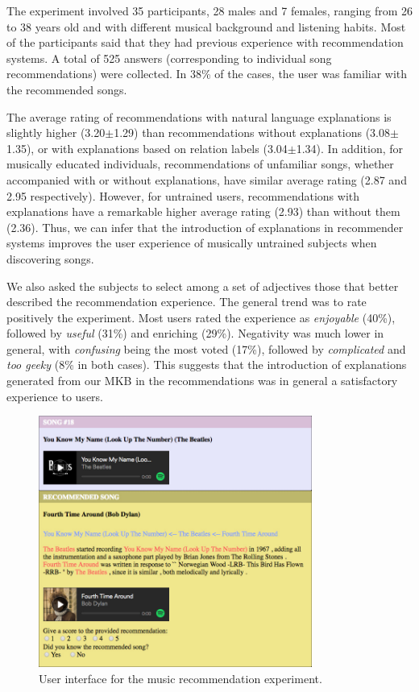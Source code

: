 The experiment involved 35 participants, 28 males and 7 females, ranging from 26 to 38 years old and with different musical background and listening habits. Most of the participants said that they had previous experience with recommendation systems. 
A total of 525 answers (corresponding to individual song recommendations) were collected. In 38\% of the cases, the user was familiar with the recommended songs.

The average rating of recommendations with natural language explanations is slightly higher (3.20$\pm$1.29) than recommendations without explanations (3.08$\pm$1.35), or with explanations based on relation labels (3.04$\pm$1.34). In addition, for musically educated individuals, recommendations of unfamiliar songs, whether accompanied with or without explanations, have similar average rating (2.87 and 2.95 respectively). However, for untrained users, recommendations with explanations have a remarkable higher average rating (2.93) than without them (2.36). Thus, we can infer that the introduction of explanations in recommender systems improves the user experience of musically untrained subjects when discovering songs.

We also asked the subjects to select among a set of adjectives those that better described the recommendation experience. The general trend was to rate positively the experiment. Most users rated the experience as \textit{enjoyable} (40\%), followed by \textit{useful} (31\%) and enriching (29\%). Negativity was much lower in general, with \textit{confusing} being the most voted (17\%), followed by \textit{complicated} and \textit{too geeky} (8\% in both cases). This suggests that the introduction of explanations generated from our MKB in the recommendations was in general a satisfactory experience to users.


\begin{figure}[!htp]
\centerline{
\includegraphics[width=0.8\textwidth]{ch04_kbconstruction_pics/recommender.jpg}}
\caption{User interface for the music recommendation experiment.}
\label{fig:kb:recommender}
\end{figure}


